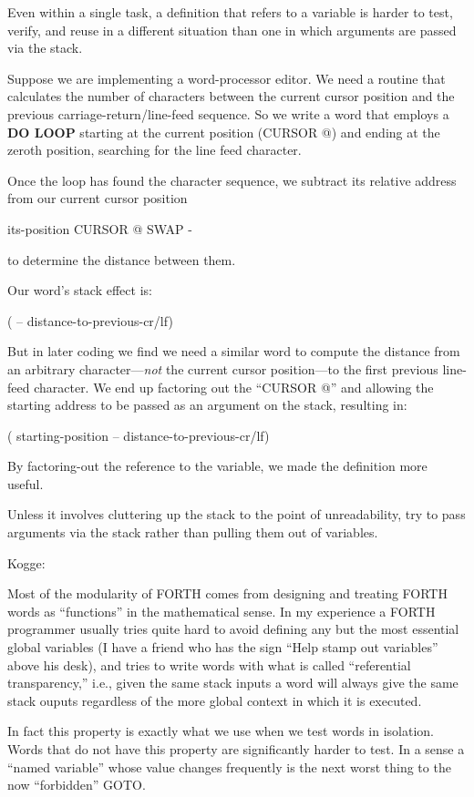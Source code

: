 Even within a single task, a definition that refers to a variable is
harder to test, verify, and reuse in a different situation than one in which
arguments are passed via the stack.

Suppose we are implementing a word-processor editor. We need a
routine that calculates the number of characters between the current cursor
position and the previous carriage-return/line-feed sequence. So we
write a word that employs a \textbf{DO LOOP} starting at the current position
(CURSOR @) and ending at the zeroth position, searching for the line
feed character.

Once the loop has found the character sequence, we subtract its
relative address from our current cursor position

\begin{Code}
its-position CURSOR @  SWAP -
\end{Code}
to determine the distance between them.

Our word's stack effect is:

\begin{Code}
( -- distance-to-previous-cr/lf)
\end{Code}
But in later coding we find we need a similar word to compute the
distance from an arbitrary character---\emph{not} the current cursor
position---to the first previous line-feed character. We end up factoring
out the ``CURSOR @'' and allowing the starting address to be passed as an
argument on the stack, resulting in:

\begin{Code}
( starting-position -- distance-to-previous-cr/lf)
\end{Code}
By factoring-out the reference to the variable, we made the definition
more useful.

\begin{tip}
Unless it involves cluttering up the stack to the point of unreadability, try
to pass arguments via the stack rather than pulling them out of variables.
\end{tip}
\begin{interview}
Kogge:
\begin{tfquot}
Most of the modularity of FORTH comes from designing and treating
FORTH words as ``functions'' in the mathematical sense. In my experience
a FORTH programmer usually tries quite hard to avoid defining any but
the most essential global variables (I have a friend who has the sign ``Help
stamp out variables'' above his desk), and tries to write words with what is
called ``referential transparency,'' i.e., given the same stack inputs a word
will always give the same stack ouputs regardless of the more global
context in which it is executed.

In fact this property is exactly what we use when we test words in isolation.
Words that do not have this property are significantly harder to test. In a
sense a ``named variable'' whose value changes frequently is the next worst
thing to the now ``forbidden'' GOTO.
\end{tfquot}
\end{interview}

